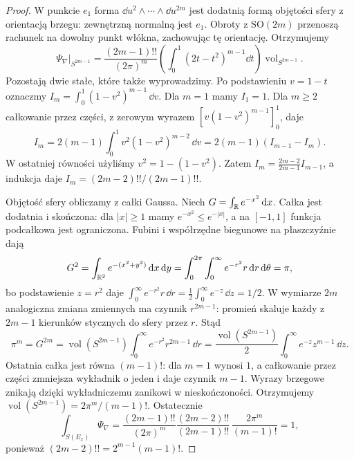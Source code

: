 \begin{proof}
W punkcie $e_1$ forma
$\dd u^2\wedge\cdots\wedge\dd u^{2m}$
jest dodatnią formą objętości sfery z orientacją brzegu:
zewnętrzną normalną jest $e_1$.
Obroty z $\mathrm{SO}(2m)$ przenoszą rachunek na dowolny
punkt włókna, zachowując tę orientację.
Otrzymujemy
\[
 \Psi_\nabla|_{S^{2m-1}}
 =\frac{(2m-1)!!}{(2\pi)^m}
 \left(\int_0^1(2t-t^2)^{m-1}\dd t\right)
 \operatorname{vol}_{S^{2m-1}}.
\]
Pozostają dwie stałe, które także wyprowadzimy.
Po podstawieniu $v=1-t$ oznaczmy
$I_m=\int_0^1(1-v^2)^{m-1}\,\dd v$.
Dla $m=1$ mamy $I_1=1$.
Dla $m\geq2$ całkowanie przez części, z zerowym wyrazem
$[v(1-v^2)^{m-1}]_0^1$, daje
\[
 I_m=2(m-1)\int_0^1v^2(1-v^2)^{m-2}\,\dd v
     =2(m-1)(I_{m-1}-I_m).
\]
W ostatniej równości użyliśmy $v^2=1-(1-v^2)$.
Zatem $I_m=\frac{2m-2}{2m-1}I_{m-1}$,
a indukcja daje $I_m=(2m-2)!!/(2m-1)!!$.

Objętość sfery obliczamy z całki Gaussa.
Niech $G=\int_{\mathbb{R}} e^{-x^2}\,\mathrm d x$.
Całka jest dodatnia i skończona:
dla $|x|\geq1$ mamy $e^{-x^2}\leq e^{-|x|}$,
a na $[-1,1]$ funkcja podcałkowa jest ograniczona.
Fubini i współrzędne biegunowe na płaszczyźnie dają
\[
 G^2=\int_{\mathbb{R}^2}e^{-(x^2+y^2)}\,\mathrm d x\,\mathrm d y
 =\int_0^{2\pi}\int_0^\infty e^{-r^2}r\,\mathrm d r\,\mathrm d\theta
 =\pi,
\]
bo podstawienie $z=r^2$ daje
$\int_0^\infty e^{-r^2}r\,\dd r=\frac12\int_0^\infty e^{-z}\,\dd z=1/2$.
W wymiarze $2m$ analogiczna zmiana zmiennych ma czynnik
$r^{2m-1}$: promień skaluje każdy z $2m-1$ kierunków
stycznych do sfery przez $r$.
Stąd
\[
 \pi^m=G^{2m}
 =\operatorname{vol}(S^{2m-1})\int_0^\infty e^{-r^2}r^{2m-1}\,\dd r
 =\frac{\operatorname{vol}(S^{2m-1})}{2}
     \int_0^\infty e^{-z}z^{m-1}\,\dd z.
\]
Ostatnia całka jest równa $(m-1)!$:
dla $m=1$ wynosi $1$, a całkowanie przez części
zmniejsza wykładnik o jeden i daje czynnik $m-1$.
Wyrazy brzegowe znikają dzięki wykładniczemu zanikowi w nieskończoności.
Otrzymujemy $\operatorname{vol}(S^{2m-1})=2\pi^m/(m-1)!$.
Ostatecznie
\[
 \int_{S(E_x)}\Psi_\nabla
 =\frac{(2m-1)!!}{(2\pi)^m}
   \frac{(2m-2)!!}{(2m-1)!!}\,
   \frac{2\pi^m}{(m-1)!}
 =1,
\]
ponieważ $(2m-2)!!=2^{m-1}(m-1)!$.
\end{proof}


